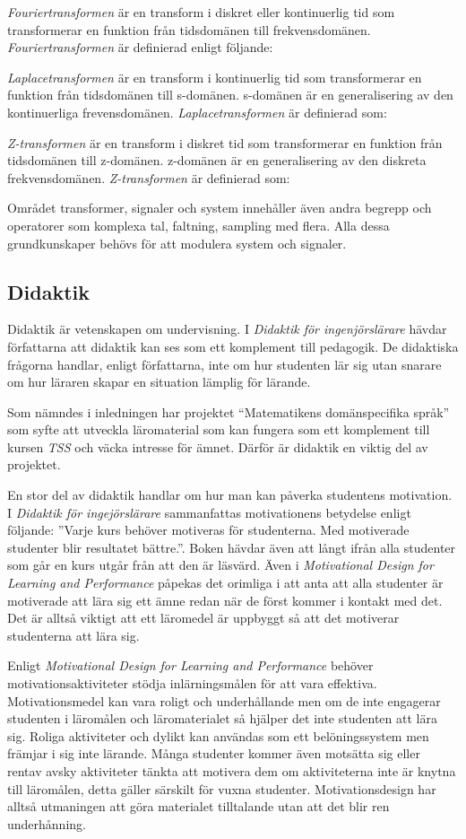 \documentclass[]{article}
\begin{document}
\textit{Fouriertransformen} är en transform i diskret eller kontinuerlig tid som transformerar en funktion från
tidsdomänen till frekvensdomänen. \textit{Fouriertransformen} är definierad enligt följande:

\textit{Laplacetransformen} är en transform i kontinuerlig tid som transformerar en funktion från tidsdomänen till
s-domänen. s-domänen är en generalisering av den kontinuerliga frevensdomänen.  \textit{Laplacetransformen} är
definierad som:


\textit{Z-transformen} är en transform i diskret tid som transformerar en funktion från tidsdomänen till z-domänen.
z-domänen är en generalisering av den diskreta frekvensdomänen. \textit{Z-transformen} är definierad som:

Området transformer, signaler och system innehåller även andra begrepp och operatorer som komplexa tal, faltning,
sampling med flera.  Alla dessa grundkunskaper behövs för att modulera system och signaler.

\subsection{Didaktik}
Didaktik är vetenskapen om undervisning.
I \textit{Didaktik för ingenjörslärare} hävdar författarna att
didaktik kan ses som ett komplement till pedagogik.
De didaktiska frågorna handlar, enligt författarna,
inte om hur studenten lär sig utan snarare om hur läraren skapar en
situation lämplig för lärande.

Som nämndes i inledningen har projektet “Matematikens domänspecifika språk”
som syfte att utveckla läromaterial som kan fungera som ett komplement till
kursen \textit{TSS} och väcka intresse för ämnet.
Därför är didaktik en viktig del av projektet.

En stor del av didaktik handlar om hur man kan påverka studentens motivation.
I \textit{Didaktik för ingejörslärare} sammanfattas motivationens betydelse
enligt följande: ”Varje kurs behöver motiveras för studenterna.
Med motiverade studenter blir resultatet bättre.”.
Boken hävdar även att långt ifrån alla studenter
som går en kurs utgår från att den är läsvärd.
Även i \textit{Motivational Design for Learning and Performance} påpekas det
orimliga i att anta att alla studenter är motiverade att lära sig ett ämne
redan när de först kommer i kontakt med det.
Det är alltså viktigt att ett läromedel är uppbyggt så att det motiverar
studenterna att lära sig.

Enligt \textit{Motivational Design for Learning and Performance} behöver
motivationsaktiviteter stödja inlärningsmålen för att vara effektiva.
Motivationsmedel kan vara roligt och underhållande men om de inte engagerar
studenten i läromålen och läromaterialet så hjälper det inte studenten att
lära sig. Roliga aktiviteter och dylikt kan användas som ett belöningssystem
men främjar i sig inte lärande. Många studenter kommer även motsätta sig
eller rentav avsky aktiviteter tänkta att motivera dem om aktiviteterna
inte är knytna till läromålen, detta gäller särskilt för vuxna studenter.
Motivationsdesign har alltså utmaningen att göra materialet tilltalande
utan att det blir ren underhånning.
\end{document}
